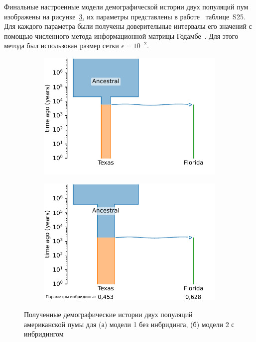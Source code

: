 Финальные настроенные модели демографической истории двух популяций пум изображены на рисунке~\ref{fig:part2:experiments:puma:res}, их параметры представлены в работе~\cite{noskova2023gadma2} таблице~S25.
Для каждого параметра были получены доверительные интервалы его значений с помощью численного метода информационной матрицы Годамбе~\cite{coffman2016computationally}.
Для этого метода был использован размер сетки $\epsilon=10^{-2}$.

\begin{figure}[ht]
    \centering
    \begin{subfigure}[b]{.49\textwidth}
    \includegraphics[width=\textwidth]{images_experiments/puma/puma_model1.pdf}
    \caption{}
    \label{fig:part2:experiments:puma:res_1}
    \end{subfigure}%
    \begin{subfigure}[b]{.49\textwidth}
    \includegraphics[width=\textwidth]{images_experiments/puma/puma_model2.pdf}
    \caption{}
    \label{fig:part2:experiments:puma:res_2}
    \end{subfigure}
    \caption{Полученные демографические истории двух популяций американской пумы  для (а) модели 1 без инбридинга, (б) модели 2 с инбридингом}
    \label{fig:part2:experiments:puma:res}
\end{figure}

